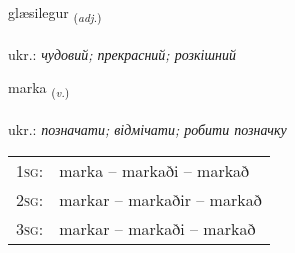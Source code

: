 \documentclass[frontgrid, backgrid]{flacards}\usepackage[]{graphicx}\usepackage[]{xcolor}
\begin{document}
\renewcommand{\flhead}{\vskip5pt \fboxsep=0pt {\small\bfseries\footnotesize Lýsingarorð | прикметник}}
\renewcommand{\fcfoot}{\vskip5pt \fboxsep=0pt \hspace{2pt}{\small\bfseries\footnotesize 2K}}

\renewcommand{\blhead}{\vskip5pt {\small\bfseries\footnotesize Lýsingarorð | прикметник }}
\renewcommand{\bcfoot}{\vskip5pt \hspace{2pt}{\small\bfseries\footnotesize 2K}}


{glæsilegur \small{\textsubscript{(\textit{adj.})}} \\[1ex] %
\textphonetic{[klaiːsɪlɛɣʏr]} \\
ukr.: \emph{чудовий; прекрасний; розкішний} \\  [2ex]
\renewcommand*{\arraystretch}{0.8}
}

\renewcommand{\flhead}{\vskip5pt \fboxsep=0pt {\small\bfseries\footnotesize Sagnorð | дієслово}}
\renewcommand{\fcfoot}{\vskip5pt \fboxsep=0pt \hspace{2pt}{\small\bfseries\footnotesize 2K}}

\renewcommand{\blhead}{\vskip5pt {\small\bfseries\footnotesize Sagnorð | дієслово }}
\renewcommand{\bcfoot}{\vskip5pt \hspace{2pt}{\small\bfseries\footnotesize 2K}}


{marka \small{\textsubscript{(\textit{v.})}} \\[1ex] %
\textphonetic{[mar̥ka]} \\
ukr.: \emph{позначати; відмічати; робити позначку} \\  [2ex]
\renewcommand*{\arraystretch}{0.8}
\begin{tabular}{p{1cm}l}
\textsc{1sg}: & marka -- markaði -- markað \\ 
\textsc{2sg}: & markar -- markaðir -- markað \\ 
\textsc{3sg}: & markar -- markaði -- markað \\ 
\end{tabular}
}
\end{document}
